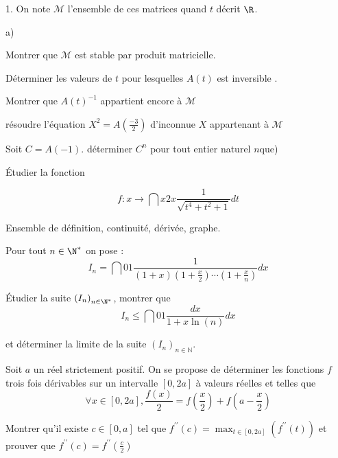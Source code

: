 \documentclass[11pt]{article}%
\begin{document}
\begin{noliste}{1.}
  On note $\mathcal{M}$ l'ensemble de ces matrices quand $t$ décrit
  $\R$.

  \begin{noliste}{a)}
  \item Montrer que $\mathcal{M}$ est stable par produit matricielle.

  \item Déterminer les valeurs de $t$ pour lesquelles $A\left( t\right) $
    est inversible .

    Montrer que $A\left( t\right) ^{-1}$ appartient encore à $\mathcal{M}$

  \item résoudre l'équation $X^{2}=A\left( \frac{-3}{2}\right) $
    d'inconnue $X$ appartenant à $\mathcal{M}$

  \item Soit $C=A\left( -1\right) .$ déterminer $C^{n}$ pour tout entier
    naturel $n$que)
  \end{noliste}

\item Étudier la fonction

  \[
  f:x\rightarrow \dint{x}{2x}\frac{1}{\sqrt{t^{4}+t^{2}+1}}dt 
  \]

  Ensemble de définition, continuité, dérivée, graphe.

\item Pour tout $n\in \N^{\ast }$ on pose : 
  \[
  I_{n}=\dint{0}{1}\frac{1}{\left( 1+x\right) \left( 1+\frac{x}{2}\right)
    \cdots \left( 1+\frac{x}{n}\right) }dx 
  \]

  Étudier la suite $\left( I_{n}\right) _{n\in \N^{\ast }}$, montrer
  que
  \[
  I_{n}\leq \dint{0}{1}\frac{dx}{1+x\ln \left( n\right) }dx 
  \]

  et déterminer la limite de la suite $\left( I_{n}\right) _{n\in
    \mathbb{N}}$.

\item Soit $a$ un réel strictement positif. On se propose de
  déterminer les fonctions $f$ trois fois dérivables sur un intervalle
  $\left[ 0,2a\right] $ à valeurs réelles et telles que
  \[
  \forall x\in \left[ 0,2a\right] ,\frac{f\left( x\right) }{2}=f\left( \frac{x%
    }{2}\right) +f\left( a-\frac{x}{2}\right) 
  \]

  Montrer qu'il existe $c\in \left[ 0,a\right] $ tel que $f^{\prime \prime
  }\left( c\right) =\max_{t\in \left[ 0,2a\right] }\left( f^{\prime \prime
    }\left( t\right) \right) $ et prouver que $f^{\prime \prime }\left( c\right)
  =f^{\prime \prime }\left( \frac{c}{2}\right) $


\end{noliste}
\end{document}
